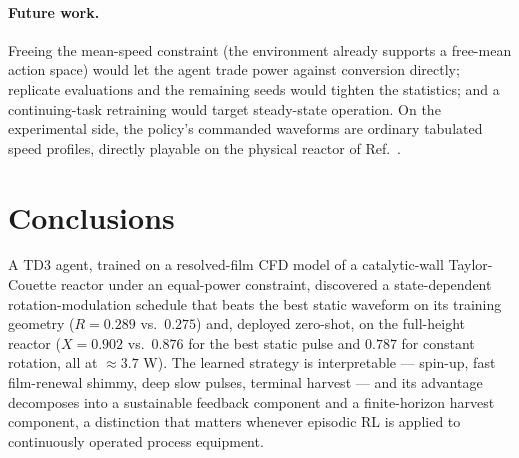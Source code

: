 \documentclass{article}
\begin{document}
\paragraph{Future work.} Freeing the mean-speed constraint (the environment
already supports a free-mean action space) would let the agent trade power
against conversion directly; replicate evaluations and the remaining seeds
would tighten the statistics; and a continuing-task retraining would target
steady-state operation. On the experimental side, the policy's commanded
waveforms are ordinary tabulated speed profiles, directly playable on the
physical reactor of Ref.~\cite{lopez2024process}.

\section{Conclusions}
A TD3 agent, trained on a resolved-film CFD model of a catalytic-wall
Taylor-Couette reactor under an equal-power constraint, discovered a
state-dependent rotation-modulation schedule that beats the best static
waveform on its training geometry ($R = 0.289$ vs.\ $0.275$) and, deployed
zero-shot, on the full-height reactor ($X = 0.902$ vs.\ $0.876$ for the best
static pulse and $0.787$ for constant rotation, all at $\approx 3.7$ W). The
learned strategy is interpretable --- spin-up, fast film-renewal shimmy, deep
slow pulses, terminal harvest --- and its advantage decomposes into a
sustainable feedback component and a finite-horizon harvest component, a
distinction that matters whenever episodic RL is applied to continuously
operated process equipment.



\end{document}
